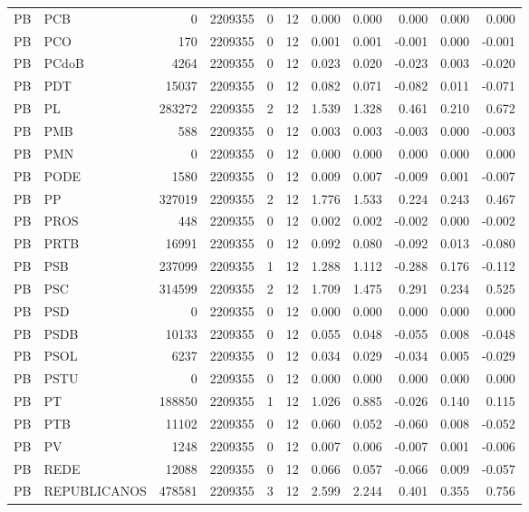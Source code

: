 \begin{landscape}
\begin{longtable}{llrrrrrrrrr}
PB & PCB & 0 & 2209355 & 0 & 12 & 0.000 & 0.000 & 0.000 & 0.000 & 0.000 \\
PB & PCO & 170 & 2209355 & 0 & 12 & 0.001 & 0.001 & -0.001 & 0.000 & -0.001 \\
PB & PCdoB & 4264 & 2209355 & 0 & 12 & 0.023 & 0.020 & -0.023 & 0.003 & -0.020 \\
PB & PDT & 15037 & 2209355 & 0 & 12 & 0.082 & 0.071 & -0.082 & 0.011 & -0.071 \\
PB & PL & 283272 & 2209355 & 2 & 12 & 1.539 & 1.328 & 0.461 & 0.210 & 0.672 \\
PB & PMB & 588 & 2209355 & 0 & 12 & 0.003 & 0.003 & -0.003 & 0.000 & -0.003 \\
PB & PMN & 0 & 2209355 & 0 & 12 & 0.000 & 0.000 & 0.000 & 0.000 & 0.000 \\
PB & PODE & 1580 & 2209355 & 0 & 12 & 0.009 & 0.007 & -0.009 & 0.001 & -0.007 \\
PB & PP & 327019 & 2209355 & 2 & 12 & 1.776 & 1.533 & 0.224 & 0.243 & 0.467 \\
PB & PROS & 448 & 2209355 & 0 & 12 & 0.002 & 0.002 & -0.002 & 0.000 & -0.002 \\
PB & PRTB & 16991 & 2209355 & 0 & 12 & 0.092 & 0.080 & -0.092 & 0.013 & -0.080 \\
PB & PSB & 237099 & 2209355 & 1 & 12 & 1.288 & 1.112 & -0.288 & 0.176 & -0.112 \\
PB & PSC & 314599 & 2209355 & 2 & 12 & 1.709 & 1.475 & 0.291 & 0.234 & 0.525 \\
PB & PSD & 0 & 2209355 & 0 & 12 & 0.000 & 0.000 & 0.000 & 0.000 & 0.000 \\
PB & PSDB & 10133 & 2209355 & 0 & 12 & 0.055 & 0.048 & -0.055 & 0.008 & -0.048 \\
PB & PSOL & 6237 & 2209355 & 0 & 12 & 0.034 & 0.029 & -0.034 & 0.005 & -0.029 \\
PB & PSTU & 0 & 2209355 & 0 & 12 & 0.000 & 0.000 & 0.000 & 0.000 & 0.000 \\
PB & PT & 188850 & 2209355 & 1 & 12 & 1.026 & 0.885 & -0.026 & 0.140 & 0.115 \\
PB & PTB & 11102 & 2209355 & 0 & 12 & 0.060 & 0.052 & -0.060 & 0.008 & -0.052 \\
PB & PV & 1248 & 2209355 & 0 & 12 & 0.007 & 0.006 & -0.007 & 0.001 & -0.006 \\
PB & REDE & 12088 & 2209355 & 0 & 12 & 0.066 & 0.057 & -0.066 & 0.009 & -0.057 \\
PB & REPUBLICANOS & 478581 & 2209355 & 3 & 12 & 2.599 & 2.244 & 0.401 & 0.355 & 0.756 \\

\end{longtable}
\end{landscape}
